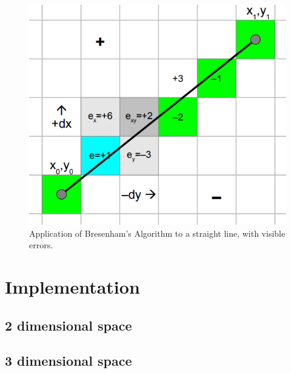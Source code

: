 \begin{figure}[h]
	\centering
	\includegraphics[width=0.5\linewidth]{img/Bresenhams}
	\caption{Application of Bresenham's Algorithm to a straight line, with visible errors. \cite{Zingl2012}}
	\label{fig:collision_detection_bresenham}
\end{figure}

\section{Implementation}

\subsection{2 dimensional space}

\subsection{3 dimensional space}

